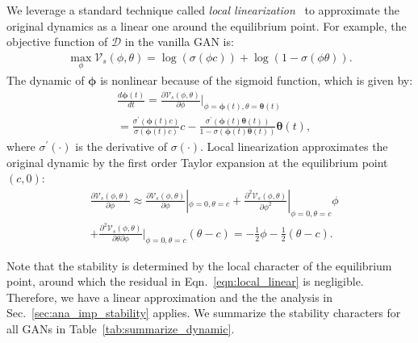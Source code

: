 \documentclass{article}
\newcommand{\xD}{\mathcal{D}}
\newcommand{\uV}{\mathcal{V}}
\newcommand{\ttheta}{\bm{\theta}}
\newcommand{\tphi}{\bm{\phi}}
\newcommand{\tabl}[1]{Table~\ref{tab:#1}}
\newcommand{\eqn}[1]{Eqn.~\eqref{eqn:#1}}
\newcommand{\secref}[1]{Sec.~\ref{sec:#1}} \usepackage{wrapfig}
\theoremstyle{definition}
\begin{document}
We leverage a standard technique called {\it local linearization}~\cite{khalil2002nonlinear} to approximate the original dynamics as a linear one around the equilibrium point.
For example, the objective function of $\xD$ in the vanilla GAN is:
\begin{align}
\max_{\phi} \uV_s(\phi, \theta) = \log(\sigma(\phi c)) + \log(1-\sigma(\phi \theta)).
\end{align}
The dynamic of $\tphi$ is nonlinear because of the sigmoid function, which is given by:
\begin{align}
&\frac{d\tphi(t)}{dt} = \frac{\partial \uV_s(\phi, \theta)}{\partial \phi}|_{\phi=\tphi(t), \theta=\ttheta(t)} \nonumber\\
&= \frac{\sigma^\prime(\tphi(t) c)}{\sigma(\tphi(t) c)}c - \frac{\sigma^\prime(\tphi(t) \ttheta(t))}{1 - \sigma(\tphi(t) \ttheta(t))}\ttheta(t),
\end{align}
where $\sigma^\prime(\cdot)$ is the derivative of $\sigma(\cdot)$.
Local linearization approximates the original dynamic by the first order Taylor expansion at the equilibrium point $(c, 0)$:
\begin{align}
&\frac{\partial \uV_s(\phi, \theta)}{\partial \phi}\approx \frac{\partial \uV_s(\phi, \theta)}{\partial \phi}|_{\phi=0, \theta=c} + 
\frac{\partial^2 \uV_s(\phi, \theta)}{\partial \phi^2}|_{\phi=0, \theta=c}\phi  \nonumber\\
&+ \frac{\partial^2 \uV_s(\phi, \theta)}{\partial \theta\partial \phi}|_{\phi=0, \theta=c}(\theta-c) 
= -\frac{1}{2} \phi - \frac{1}{2}(\theta - c).
\label{eqn:local_linear}
\end{align}

Note that the stability is determined by the local character of the equilibrium point, around which the residual in \eqn{local_linear} is negligible. Therefore, we have a linear approximation and the the analysis in \secref{ana_imp_stability} applies. We summarize the stability characters for all GANs in \tabl{summarize_dynamic}.
\end{document}
